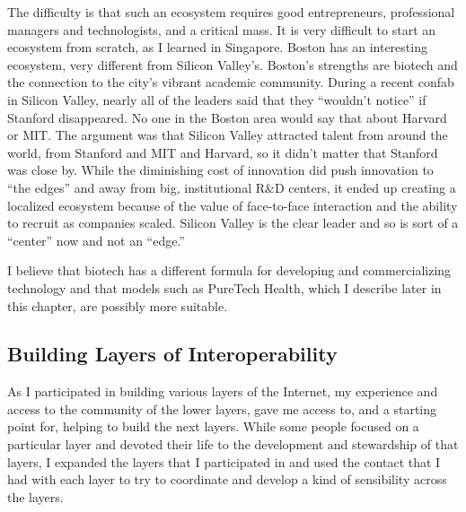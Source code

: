 The difficulty is that such an ecosystem requires good entrepreneurs, professional managers and technologists, and a critical mass. It is very difficult to start an ecosystem from scratch, as I learned in Singapore. Boston has an interesting ecosystem, very different from Silicon Valley’s. Boston’s strengths are biotech and the connection to the city's vibrant academic community. During a recent confab in Silicon Valley, nearly all of the leaders said that they ``wouldn't notice'' if Stanford disappeared. No one in the Boston area would say that about Harvard or MIT. The argument was that Silicon Valley attracted talent from around the world, from Stanford and MIT and Harvard, so it didn't matter that Stanford was close by. While the diminishing cost of innovation did push innovation to ``the edges'' and away from big, institutional R\&D centers, it ended up creating a localized ecosystem because of the value of face-to-face interaction and the ability to recruit as companies scaled. Silicon Valley is the clear leader and so is sort of a ``center'' now and not an ``edge.'' 

I believe that biotech has a different formula for developing and commercializing technology and that models such as PureTech Health, which I describe later in this chapter, are possibly more suitable.


\subsection{Building Layers of Interoperability}
\label{sec:PSI}

As I participated in building various layers of the Internet, my experience and access to the community of the lower layers, gave me access to, and a starting point for, helping to build the next layers. While some people focused on a particular layer and devoted their life to the development and stewardship of that layers, I expanded the layers that I participated in and used the contact that I had with each layer to try to coordinate and develop a kind of sensibility across the layers.

